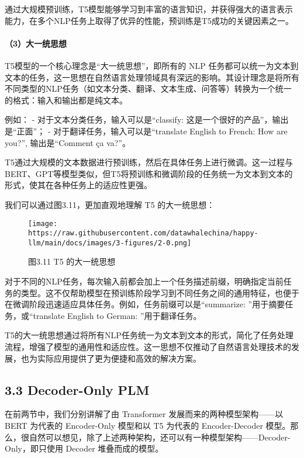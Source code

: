 \documentclass[
]{article}
\begin{document}
通过大规模预训练，T5模型能够学习到丰富的语言知识，并获得强大的语言表示能力，在多个NLP任务上取得了优异的性能，预训练是T5成功的关键因素之一。

\paragraph{（3）大一统思想}\label{ux5927ux4e00ux7edfux601dux60f3}

T5模型的一个核心理念是``大一统思想''，即所有的 NLP
任务都可以统一为文本到文本的任务，这一思想在自然语言处理领域具有深远的影响。其设计理念是将所有不同类型的NLP任务（如文本分类、翻译、文本生成、问答等）转换为一个统一的格式：输入和输出都是纯文本。

例如： - 对于文本分类任务，输入可以是``classify:
这是一个很好的产品''，输出是``正面''； -
对于翻译任务，输入可以是``translate English to French: How are you?'',
输出是``Comment ça va?''。

T5通过大规模的文本数据进行预训练，然后在具体任务上进行微调。这一过程与BERT、GPT等模型类似，但T5将预训练和微调阶段的任务统一为文本到文本的形式，使其在各种任务上的适应性更强。

我们可以通过图3.11，更加直观地理解 T5 的大一统思想：

\begin{figure}[htbp]\centering
\texttt{[image: https://raw.githubusercontent.com/datawhalechina/happy-llm/main/docs/images/3-figures/2-0.png]}
\caption{图3.11 T5 的大一统思想}
\end{figure}

对于不同的NLP任务，每次输入前都会加上一个任务描述前缀，明确指定当前任务的类型。这不仅帮助模型在预训练阶段学习到不同任务之间的通用特征，也便于在微调阶段迅速适应具体任务。例如，任务前缀可以是``summarize:
''用于摘要任务，或``translate English to German: ''用于翻译任务。

T5的大一统思想通过将所有NLP任务统一为文本到文本的形式，简化了任务处理流程，增强了模型的通用性和适应性。这一思想不仅推动了自然语言处理技术的发展，也为实际应用提供了更为便捷和高效的解决方案。

\subsection{3.3 Decoder-Only PLM}\label{decoder-only-plm}

在前两节中，我们分别讲解了由 Transformer 发展而来的两种模型架构------以
BERT 为代表的 Encoder-Only 模型和以 T5 为代表的 Encoder-Decoder
模型。那么，很自然可以想见，除了上述两种架构，还可以有一种模型架构------Decoder-Only，即只使用
Decoder 堆叠而成的模型。
\end{document}

